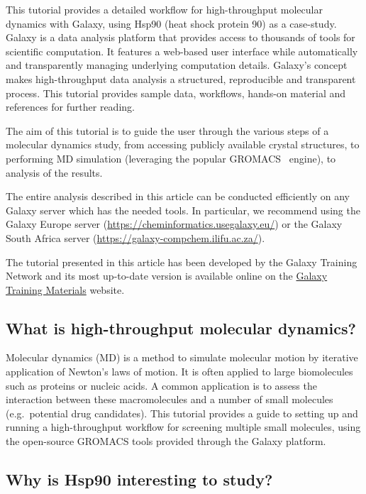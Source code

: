 \documentclass[twocolumn]{bmcart}%
\begin{document}
This tutorial provides a detailed workflow for high-throughput molecular dynamics with Galaxy, using Hsp90 (heat shock protein 90) as a case-study. Galaxy \cite{afgan_galaxy_2018} is a data analysis platform that provides access to thousands of tools for scientific computation. It features a web-based user interface while automatically and transparently managing underlying computation details. Galaxy's
concept makes high-throughput data analysis a structured, reproducible and transparent process. This tutorial provides sample data, workflows, hands-on material and references for further reading.

The aim of this tutorial is to guide the user through the various steps of a molecular dynamics study, from accessing publicly available crystal structures, to performing MD simulation (leveraging the popular GROMACS~\cite{abraham_gromacs_2015} engine), to analysis of the results.

The entire analysis described in this article can be conducted efficiently on any Galaxy server which has the needed tools. In particular, we recommend using the Galaxy Europe server
(\url{https://cheminformatics.usegalaxy.eu/}) or the Galaxy South Africa server (\url{https://galaxy-compchem.ilifu.ac.za/}).

The tutorial presented in this article has been developed by the Galaxy Training Network \cite{Batut2018} and its most up-to-date version is available online on the \href{https://training.galaxyproject.org/topics/computational-chemistry/tutorials/htmd-analysis/tutorial.html}{Galaxy Training Materials} website.


\subsection*{What is high-throughput molecular
dynamics?}\label{what-is-high-throughput-molecular-dynamics}

Molecular dynamics (MD) is a method to simulate molecular motion by
iterative application of Newton's laws of motion. It is often applied to
large biomolecules such as proteins or nucleic acids. A common
application is to assess the interaction between these macromolecules
and a number of small molecules (e.g.~potential drug candidates). This
tutorial provides a guide to setting up and running a high-throughput
workflow for screening multiple small molecules, using the open-source
GROMACS tools provided through the Galaxy platform.

\subsection*{Why is Hsp90 interesting to
study?}\label{why-is-hsp90-interesting-to-study}
\end{document}
